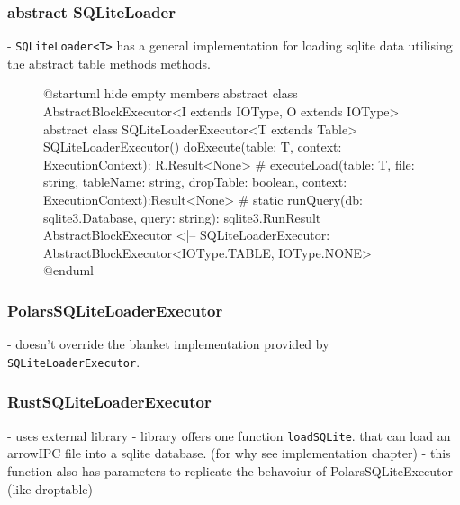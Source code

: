 \subsubsection{abstract SQLiteLoader}
- \Verb|SQLiteLoader<T>| has a general implementation for loading sqlite data utilising the abstract table methods methods.
\begin{figure}
	\begin{plantuml}
		@startuml
		hide empty members
		abstract class AbstractBlockExecutor<I extends IOType, O extends IOType>
		abstract class SQLiteLoaderExecutor<T extends Table> {
		SQLiteLoaderExecutor()
		doExecute(table: T, context: ExecutionContext): R.Result<None>
		# executeLoad(table: T, file: string, tableName: string, dropTable: boolean, context: ExecutionContext):Result<None>
		# {static} runQuery(db: sqlite3.Database, query: string): sqlite3.RunResult
		}
		AbstractBlockExecutor <|-- SQLiteLoaderExecutor: AbstractBlockExecutor<IOType.TABLE, IOType.NONE>
		@enduml
	\end{plantuml}
	\caption{}
	\label{fig:uml:sqliteloader}
\end{figure}

\subsubsection{PolarsSQLiteLoaderExecutor}
- doesn't override the blanket implementation provided by \Verb|SQLiteLoaderExecutor|.

\subsubsection{RustSQLiteLoaderExecutor}
- uses external library
- library offers one function \Verb|loadSQLite|. that can load an arrowIPC file into a sqlite database. (for why see implementation chapter)
- this function also has parameters to replicate the behavoiur of PolarsSQLiteExecutor (like droptable)



